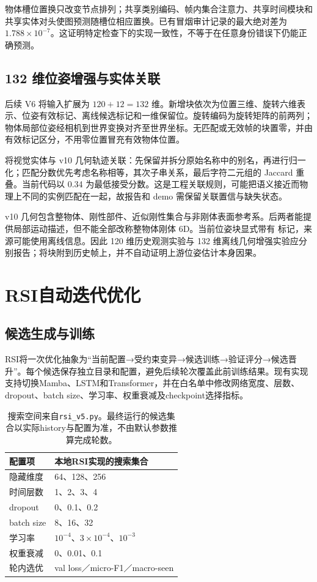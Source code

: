 物体槽位置换只改变节点排列；共享类别编码、帧内集合注意力、共享时间模块和共享实体对头使图预测随槽位相应置换。已有冒烟审计记录的最大绝对差为 $1.788\times10^{-7}$。这证明特定检查下的实现一致性，不等于在任意身份错误下仍能正确预测。


\subsection{132 维位姿增强与实体关联}
后续 V6 将输入扩展为 $120+12=132$ 维。新增块依次为位置三维、旋转六维表示、位姿有效标记、离线候选标记和一维保留位。旋转编码为旋转矩阵的前两列；物体局部位姿经相机到世界变换对齐至世界坐标。无匹配或无效帧的块置零，并由有效标记区分，不用零位置冒充有效物体位置。

 将视觉实体与 v10 几何轨迹关联：先保留并拆分原始名称中的别名，再进行归一化；匹配分数优先考虑名称相等，其次子串关系，最后字符二元组的 Jaccard 重叠。当前代码以 0.34 为最低接受分数。这是工程关联规则，可能把语义接近而物理上不同的实例匹配在一起，故报告和 demo 需保留关联置信与缺失状态。

v10 几何包含整物体、刚性部件、近似刚性集合与非刚体表面参考系。后两者能提供局部运动描述，但不能全部改称整物体刚体 6D。当前位姿块显式带有  标记，来源可能使用离线信息。因此 120 维历史观测实验与 132 维离线几何增强实验应分别报告；将块附到历史帧上，并不自动证明上游位姿估计本身因果。

\section{RSI自动迭代优化}
\subsection{候选生成与训练}
RSI将一次优化抽象为“当前配置→受约束变异→候选训练→验证评分→候选晋升”。每个候选保存独立目录和配置，避免后续轮次覆盖此前训练结果。现有实现支持切换Mamba、LSTM和Transformer，并在白名单中修改网络宽度、层数、dropout、batch size、学习率、权重衰减及checkpoint选择指标。

\begin{table}[H]
\centering\small
\begin{tabular}{ll}
\toprule 配置项 & 本地RSI实现的搜索集合\\\midrule
隐藏维度 & 64、128、256\\
时间层数 & 1、2、3、4\\
dropout & 0、0.1、0.2\\
batch size & 8、16、32\\
学习率 & $10^{-4}$、$3\times10^{-4}$、$10^{-3}$\\
权重衰减 & 0、0.01、0.1\\
轮内选优 & val loss／micro-F1／macro-seen\\
\bottomrule
\end{tabular}
\caption{搜索空间来自\texttt{rsi\_v5.py}。最终运行的候选集合以实际history与配置为准，不由默认参数推算完成轮数。}
\end{table}

